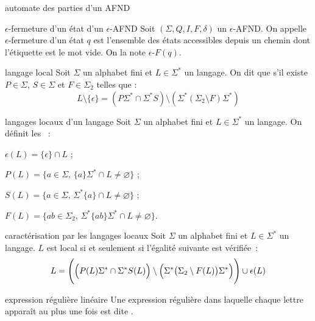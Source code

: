 \begin{adjustwidth}{-3cm}{-3cm}
\begin{definition}{2.9}{automate des parties d'un AFND}
\end{definition}

\begin{definition}{2.10}{$\epsilon$-fermeture d'un état d'un $\epsilon$-AFND}
    Soit $(\Sigma, Q, I, F, \delta)$ un $\epsilon$-AFND. On appelle $\epsilon$-fermeture d'un état $q$ est l'ensemble des états accessibles depuis un chemin dont l'étiquette est le mot vide. On la note $\epsilon$-$F(q)$.
\end{definition}

\begin{definition}{2.11}{langage local}
    Soit $\Sigma$ un alphabet fini et $L \in \Sigma^*$ un langage. On dit que  s'il existe $P \in \Sigma$, $S \in \Sigma$ et $F \in \Sigma_2$ telles que :
    $$L\setminus \{\epsilon\} = (P\Sigma^* \cap \Sigma^*S) \setminus (\Sigma^*(\Sigma_2 \setminus F)\Sigma^*)$$
\end{definition} 

\begin{definition}{2.12}{langages locaux d'un langage}
    Soit $\Sigma$ un alphabet fini et $L \in \Sigma^*$ un langage. On définit les ~:
    \begin{enumeratebf}
        \item $\epsilon(L) = \{\epsilon\} \cap L$ ;
        \item $P(L) = \{a \in \Sigma,\, \{a\}\Sigma^* \cap L \neq \varnothing\}$ ;
        \item $S(L) = \{a \in \Sigma,\, \Sigma^*\{a\} \cap L \neq \varnothing\}$ ;
        \item $F(L) = \{ab \in \Sigma_2,\, \Sigma^*\{ab\}\Sigma^* \cap L \neq \varnothing\}$.
    \end{enumeratebf}
\end{definition} 

\begin{proposition}{2.13}{caractérisation par les langages locaux}
    Soit $\Sigma$ un alphabet fini et $L \in \Sigma^*$ un langage. $L$ est local si et seulement si l'égalité suivante est vérifiée~:
    $$L = \Biggl( \Bigl( P(L) \Sigma^* \cap \Sigma^* S(L)\Bigr) \setminus \Bigl( \Sigma^* \bigl( \Sigma_2 \setminus F(L) \bigr) \Sigma^* \Bigr) \Biggr) \cup \epsilon (L) $$
\end{proposition}

\begin{definition}{2.14}{expression régulière linéaire}
    Une expression régulière dans laquelle chaque lettre apparaît au plus une fois est dite .
\end{definition}


\end{adjustwidth}
